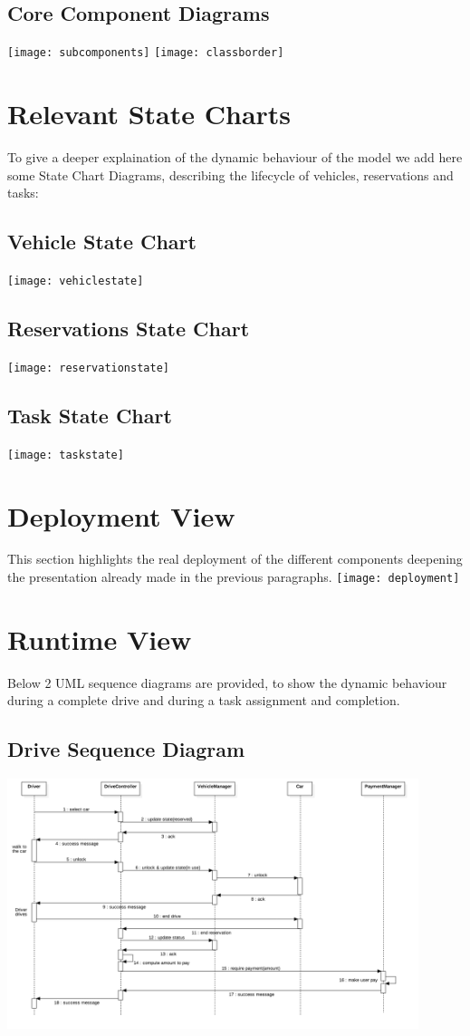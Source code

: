 \subsection{Core Component Diagrams}
\texttt{[image: subcomponents]}
\texttt{[image: classborder]}
\newpage
\section{Relevant State Charts}
To give a deeper explaination of the dynamic behaviour of the model we add here some State Chart Diagrams, describing the lifecycle of vehicles, reservations and tasks:
\subsection{Vehicle State Chart}
\texttt{[image: vehiclestate]}
\subsection{Reservations State Chart}
\texttt{[image: reservationstate]}
\subsection{Task State Chart}
\texttt{[image: taskstate]}
\newpage
\section{Deployment View}
This section highlights the real deployment of the different components deepening the presentation already made in the previous paragraphs.
\texttt{[image: deployment]}
\newpage
\section{Runtime View}
Below 2 UML sequence diagrams are provided, to show the dynamic behaviour during a complete drive and during a task assignment and completion.
\subsection{Drive Sequence Diagram}
\includegraphics[width=12cm,keepaspectratio]{drive}
